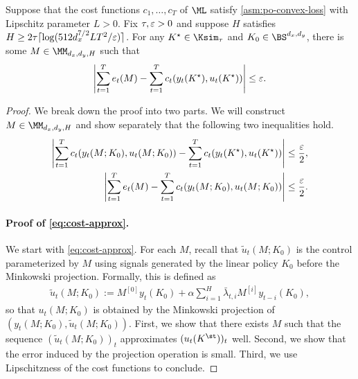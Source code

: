 \begin{lemma} [Approximation]
\label{lem:po-approx}
Suppose that the cost functions $c_1,\dots,c_T$ of $\ML$ satisfy \cref{asm:po-convex-loss} with Lipschitz parameter $L>0$. Fix $\tau,\varepsilon>0$ and suppose $H$ satisfies $H\ge 2\tau\lceil \log(512d_x^{7/2}LT^2/\varepsilon)\rceil$. For any $K^{\star}\in\Ksim_\tau$ and $K_0\in\BS^{d_x,d_y}$, there is some $M\in\MM_{d_x,d_y,H}$ such that
\begin{align*}
\left|\sum_{t=1}^T e_t(M)-\sum_{t=1}^Tc_t(y_t(K^{\star}),u_t(K^{\star}))\right|\le \varepsilon.
\end{align*}
\end{lemma}

\begin{proof}
We break down the proof into two parts. We will construct $M\in\MM_{d_x,d_y,H}$ and show separately that the following two inequalities hold.
\begin{align}
\left|\sum_{t=1}^T c_t(y_t(M;K_0),u_t(M;K_0))-\sum_{t=1}^T c_t(y_t(K^{\star}), u_t(K^{\star}))\right|\le \frac{\varepsilon}{2} \label{eq:cost-approx},\\
\left|\sum_{t=1}^T e_t(M)-\sum_{t=1}^T c_t(y_t(M;K_0),u_t(M;K_0))\right|\le \frac{\varepsilon}{2} \label{eq:ext-approx}.
\end{align}
\paragraph{Proof of \cref{eq:cost-approx}.} We start with \cref{eq:cost-approx}. For each $M$, recall that $\tilde{u}_t(M;K_0)$ is the control parameterized by $M$ using signals generated by the linear policy $K_0$ before the Minkowski projection. Formally, this is defined as
\begin{align*}
\tilde{u}_t(M;K_0) := M^{[0]}y_t(K_0)+\alpha\sum_{i=1}^H \bar{\lambda}_{t,i}M^{[i]}y_{t-i}(K_0),
\end{align*}
so that $u_t(M;K_0)$ is obtained by the Minkowski projection of $(y_t(M;K_0),\tilde{u}_t(M;K_0))$. First, we show that there exists $M$ such that the sequence $(\tilde{u}_t(M;K_0))_t$ approximates $(u_t(K^\st))_t$ well. Second, we show that the error induced by the projection operation is small. Third, we use Lipschitzness of the cost functions to conclude. 


\end{proof}
